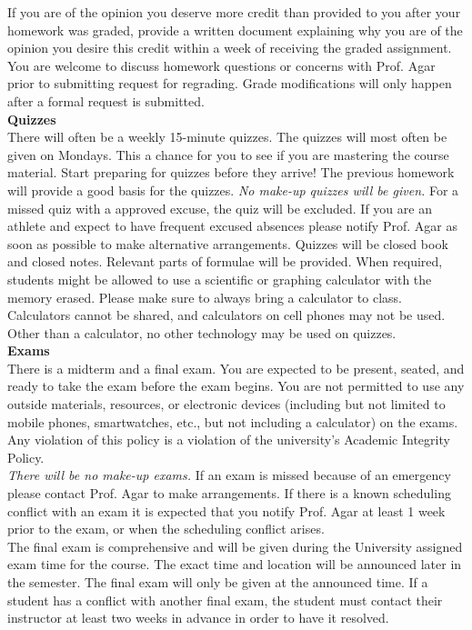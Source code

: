 \documentclass[11pt,letterpaper]{article}
\newcommand{\lefthead}[2]{\noindent\textbf{#1}\hfill\\[#2]}
\begin{document}
If you are of the opinion you deserve more credit than provided to you after your homework was graded, provide a written document explaining why you are of the opinion you desire this credit within a week of receiving the graded assignment. You are welcome to discuss homework questions or concerns with Prof. Agar prior to submitting request for regrading. Grade modifications will only happen after a formal request is submitted. 
\\[0.3cm]

\lefthead{Quizzes}{0.3cm}
\noindent There will often be a weekly 15-minute quizzes. 
The quizzes will most often be given on Mondays. 
This a chance for you to see if you are mastering the course material. 
Start preparing for quizzes before they arrive! 
The previous homework will provide a good basis for the quizzes. 
\emph{No make-up quizzes will be given.} 
For a missed quiz with a approved excuse, the quiz will be excluded.
If you are an athlete and expect to have frequent excused absences please notify Prof. Agar as soon as possible to make alternative arrangements.
Quizzes will be closed book and closed notes. 
Relevant parts of formulae will be provided.
When required, students might be allowed to use a scientific or graphing calculator with the memory erased.
Please make sure to always bring a calculator to class.
Calculators cannot be shared, and calculators on cell phones may not be used. 
Other than a calculator, no other technology may be used on quizzes. \\[0.3cm]

\lefthead{Exams}{0.3cm}
\noindent There is a midterm and a final exam. You are expected to be present, seated, and ready to take the exam before the exam begins. You are not permitted to use any outside materials, resources, or electronic devices (including but not limited to mobile phones, smartwatches, etc., but not including a calculator) on the exams. Any violation of this policy is a violation of the university's Academic Integrity Policy. \\

\noindent \emph{There will be no make-up exams.} If an exam is missed because of an emergency please contact Prof. Agar to make arrangements. If there is a known scheduling conflict with an exam it is expected that you notify Prof. Agar at least 1 week prior to the exam, or when the scheduling conflict arises. \\

\noindent The final exam is comprehensive and will be given during the University assigned exam time for the course. The exact time and location will be announced later in the semester. The final exam will only be given at the announced time. If a student has a conflict with another final exam, the student must contact their instructor at least two weeks in advance in order to have it resolved. 
\\[0.3cm]
\end{document}
